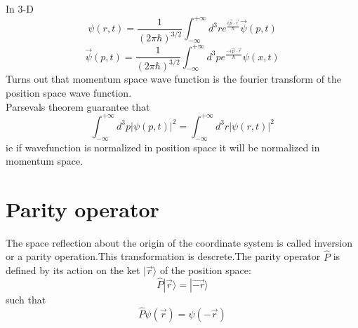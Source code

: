 In 3-D\\
$$\psi(r,t)=\frac{1}{(2\pi \hbar)^{3/2}}\int_{-\infty}^{+\infty}d^3r e^{\frac{i\vec{p}\cdot \vec{r}}{\hbar}} \vec{\psi}(p,t)$$
$$\vec{\psi}(p,t)=\frac{1}{(2\pi \hbar)^{3/2}}\int_{-\infty}^{+\infty}d^3p e^{\frac{-i\vec{p}\cdot \vec{r}}{\hbar}} \psi(x,t)$$
Turns out that momentum space wave function is the fourier transform of the position space wave function.\\
Parsevals theorem guarantee that\\
$$\int_{-\infty}^{+\infty} d^3p |\psi(p,t)|^2=\int_{-\infty}^{+\infty} d^3r |\psi(r,t)|^2$$
ie if wavefunction is normalized in position space it will be normalized in momentum space.
\section{Parity operator}
The space reflection about the origin of the coordinate system is called inversion or a parity operation.This transformation is descrete.The parity operator $\hat{P}$ is defined by its action on the ket $|\vec{r}\rangle$ of the position space:
$$\hat{P}|\vec{r}\rangle =|\vec{-r}\rangle$$
such that 
 $$\hat{P}\psi(\vec{r})=\psi(-\vec{r})$$

